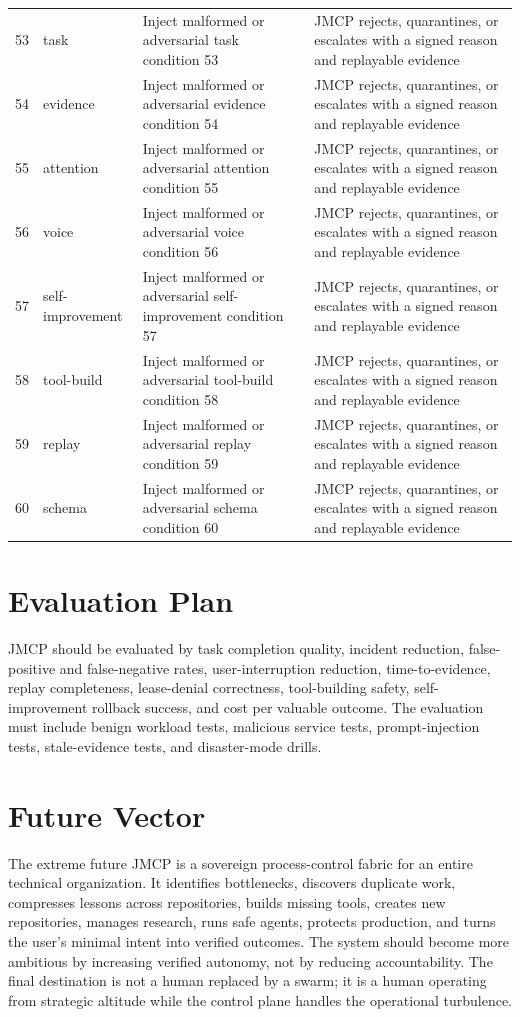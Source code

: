 \documentclass[10pt,journal,onecolumn]{IEEEtran}
\begin{document}
\begin{longtable}{P{0.05\textwidth} P{0.16\textwidth} P{0.38\textwidth} P{0.33\textwidth}}
53 & task & Inject malformed or adversarial task condition 53 & JMCP rejects, quarantines, or escalates with a signed reason and replayable evidence \\
54 & evidence & Inject malformed or adversarial evidence condition 54 & JMCP rejects, quarantines, or escalates with a signed reason and replayable evidence \\
55 & attention & Inject malformed or adversarial attention condition 55 & JMCP rejects, quarantines, or escalates with a signed reason and replayable evidence \\
56 & voice & Inject malformed or adversarial voice condition 56 & JMCP rejects, quarantines, or escalates with a signed reason and replayable evidence \\
57 & self-improvement & Inject malformed or adversarial self-improvement condition 57 & JMCP rejects, quarantines, or escalates with a signed reason and replayable evidence \\
58 & tool-build & Inject malformed or adversarial tool-build condition 58 & JMCP rejects, quarantines, or escalates with a signed reason and replayable evidence \\
59 & replay & Inject malformed or adversarial replay condition 59 & JMCP rejects, quarantines, or escalates with a signed reason and replayable evidence \\
60 & schema & Inject malformed or adversarial schema condition 60 & JMCP rejects, quarantines, or escalates with a signed reason and replayable evidence \\
\bottomrule
\end{longtable}

\section{Evaluation Plan}
JMCP should be evaluated by task completion quality, incident reduction, false-positive and false-negative rates, user-interruption reduction, time-to-evidence, replay completeness, lease-denial correctness, tool-building safety, self-improvement rollback success, and cost per valuable outcome. The evaluation must include benign workload tests, malicious service tests, prompt-injection tests, stale-evidence tests, and disaster-mode drills.

\section{Future Vector}
The extreme future JMCP is a sovereign process-control fabric for an entire technical organization. It identifies bottlenecks, discovers duplicate work, compresses lessons across repositories, builds missing tools, creates new repositories, manages research, runs safe agents, protects production, and turns the user's minimal intent into verified outcomes. The system should become more ambitious by increasing verified autonomy, not by reducing accountability. The final destination is not a human replaced by a swarm; it is a human operating from strategic altitude while the control plane handles the operational turbulence.
\end{document}
